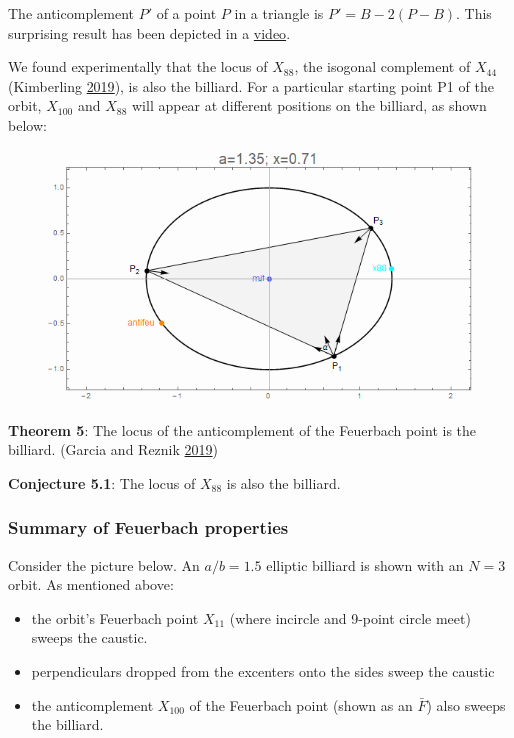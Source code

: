 \documentclass[]{article}
\providecommand{\tightlist}{%
  \setlength{\itemsep}{0pt}\setlength{\parskip}{0pt}}
\begin{document}
The anticomplement \(P'\) of a point \(P\) in a triangle is \(P'=B-2(P-B)\). This surprising result has been depicted in a \href{https://youtu.be/8JKevLpteQk}{video}.

We found experimentally that the locus of \(X_{88}\), the isogonal complement of \(X_{44}\) (Kimberling \protect\hyperlink{ref-etc}{2019}), is also the billiard. For a particular starting point P1 of the orbit, \(X_{100}\) and \(X_{88}\) will appear at different positions on the billiard, as shown below:

\begin{figure}[H]

{\centering \includegraphics[width=0.66\linewidth]{pics/antifeuer_and_x88} 

}

\end{figure}

\textbf{Theorem 5}: The locus of the anticomplement of the Feuerbach point is the billiard. (Garcia and Reznik \protect\hyperlink{ref-garcia19a}{2019})

\textbf{Conjecture 5.1}: The locus of \(X_{88}\) is also the billiard.

\hypertarget{summary-of-feuerbach-properties}{%
\subsubsection{Summary of Feuerbach properties}\label{summary-of-feuerbach-properties}}

Consider the picture below. An \(a/b=1.5\) elliptic billiard is shown with an \(N=3\) orbit. As mentioned above:

\begin{itemize}
\tightlist
\item
  the orbit's Feuerbach point \(X_11\) (where incircle and 9-point circle meet) sweeps the caustic.
\item
  perpendiculars dropped from the excenters onto the sides sweep the caustic
\item
  the anticomplement \(X_{100}\) of the Feuerbach point (shown as an \(\bar{F}\)) also sweeps the billiard.
\end{itemize}
\end{document}
